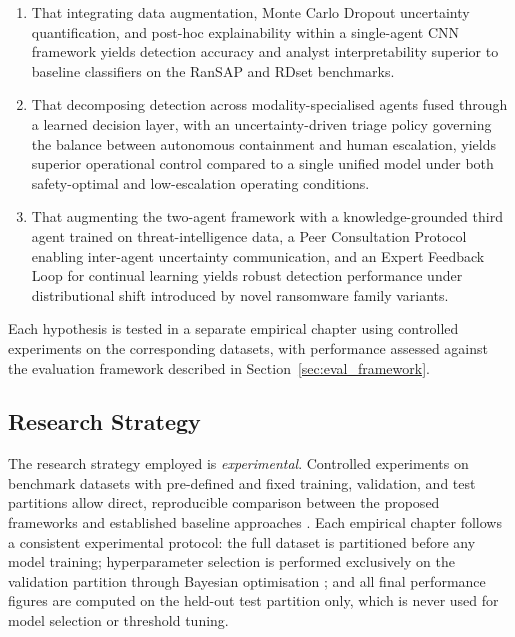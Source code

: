 \begin{enumerate}
    \item That integrating data augmentation, Monte Carlo Dropout uncertainty quantification, and
    post-hoc explainability within a single-agent CNN framework yields detection accuracy and
    analyst interpretability superior to baseline classifiers on the RanSAP and RDset benchmarks.

    \item That decomposing detection across modality-specialised agents fused through a learned
    decision layer, with an uncertainty-driven triage policy governing the balance between
    autonomous containment and human escalation, yields superior operational control compared to
    a single unified model under both safety-optimal and low-escalation operating conditions.

    \item That augmenting the two-agent framework with a knowledge-grounded third agent trained
    on threat-intelligence data, a Peer Consultation Protocol enabling inter-agent uncertainty
    communication, and an Expert Feedback Loop for continual learning yields robust detection
    performance under distributional shift introduced by novel ransomware family variants.
\end{enumerate}

Each hypothesis is tested in a separate empirical chapter using controlled experiments on the
corresponding datasets, with performance assessed against the evaluation framework described in
Section~\ref{sec:eval_framework}.

\subsection{Research Strategy}
\label{sec:strategy}

The research strategy employed is \emph{experimental}.
Controlled experiments on benchmark datasets with pre-defined and fixed training, validation, and
test partitions allow direct, reproducible comparison between the proposed frameworks and
established baseline approaches \cite{saunders2019research}.
Each empirical chapter follows a consistent experimental protocol: the full dataset is partitioned
before any model training; hyperparameter selection is performed exclusively on the validation
partition through Bayesian optimisation \cite{optuna2019}; and all final performance figures are
computed on the held-out test partition only, which is never used for model selection or threshold
tuning.

